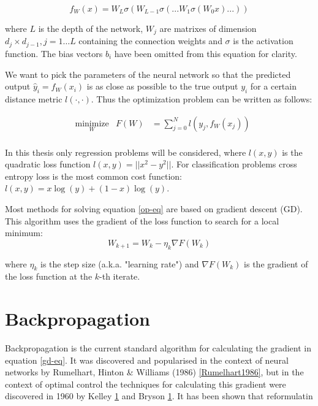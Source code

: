 \begin{equation}
         f_W(x) = W_L\sigma(W_{L-1}\sigma(...W_1\sigma(W_0x)...))
\end{equation}

where $L$ is the depth of the network, $W_j$ are matrixes of dimension $d_j \times d_{j-1}, j=1 \dots L$ containing the connection weights and $\sigma$ is the activation function. The bias vectors $b_i$ have been omitted from this equation for clarity.

We want to pick the parameters of the neural network so that the predicted output $\hat{y}_i = f_W(x_i)$ is as close as possible to the true output $y_i$ for a certain distance metric $\mathit{l(\cdot,\cdot)}$. Thus the optimization problem can be written as follows:

\begin{equation}
\begin{aligned}
& \underset{W}{\text{minimize}}
& F(W) &= \sum\limits_{j=0}^{N}l(y_j,f_W(x_j)) \\
\end{aligned}
\label{op-eq}
\end{equation}

In this thesis only regression problems will be considered, where $l(x,y)$ is the quadratic loss function $l(x,y) = ||x^2-y^2||$. For classification problems cross entropy loss is the most common cost function: $l(x,y) = x\log(y)+(1-x)\log(y)$.

Most methods for solving equation \ref{op-eq} are based on gradient descent (GD). This algorithm uses the gradient of the loss function to search for a local minimum:
\begin{equation}
W_{k+1} = W_{k} - \eta_k\nabla F(W_k)
\label{gd-eq}
\end{equation}

where $\eta_k$ is the step size (a.k.a. "learning rate") and $\nabla F(W_k)$ is the gradient of the loss function at the $k$-th iterate.  

\section{Backpropagation}
Backpropagation is the current standard algorithm for calculating the gradient in equation \ref{gd-eq}. It was discovered and popularised in the context of neural networks by Rumelhart, Hinton \& Williams (1986) \ref{Rumelhart1986}, but in the context of optimal control the techniques for calculating this gradient were discovered in 1960 by Kelley \ref{} and Bryson \ref{}. It has been shown that reformulatin



